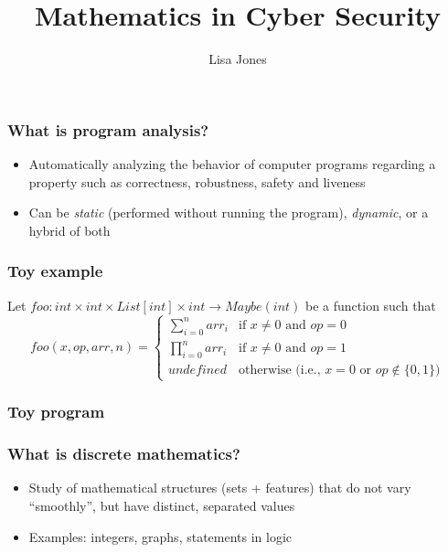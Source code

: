 \documentclass[11pt,table]{beamer}
\begin{document}
\author{Lisa Jones}
\title{Mathematics in Cyber Security}
\frame[plain]{\maketitle}

\begin{frame}
\frametitle{What is program analysis?}
  \begin{itemize}
  \item{ Automatically analyzing the behavior of computer programs regarding a property such as correctness, robustness, safety and liveness}
    \medskip
  \item{Can be \textit{static} (performed without running the program), \textit{dynamic}, or a hybrid of both}
      \end{itemize}
  \end{frame}

\begin{frame}
  \frametitle{Toy example}

  Let $ foo: int \times int \times List[int] \times int \to Maybe(int) $
  be a function such that
  \[
  foo(x, op, arr, n) = \begin{cases}
    \sum_{i=0}^{n} arr_i & \mbox{if } x \neq 0 \mbox{ and } op=0 \\
    \prod_{i=0}^{n} arr_i & \mbox{if } x \neq 0 \mbox{ and } op=1 \\
    undefined & \mbox{otherwise (i.e., } x=0 \mbox{ or } op \not\in \{0, 1\})
  \end{cases}
  \]
  
  \end{frame}

\begin{frame}[fragile]
  \frametitle{Toy program}
  
  \end{frame}


\begin{frame}
\frametitle{What is discrete mathematics?}
  \begin{itemize}
  \item{Study of mathematical structures (sets + features) that do not vary ``smoothly'', but have distinct, separated values}
    \medskip
  \item{Examples: integers, graphs, statements in logic}
  \end{itemize}
\end{frame}
\end{document}
